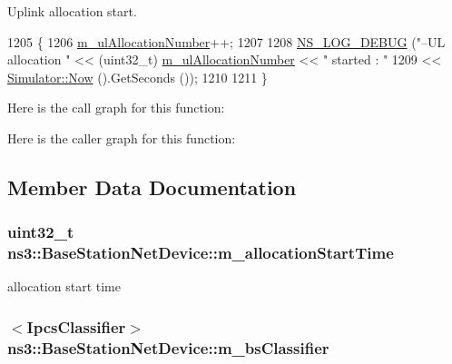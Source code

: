 Uplink allocation start. 


\begin{DoxyCode}
1205 \{
1206   \hyperlink{classns3_1_1BaseStationNetDevice_a8970c1e5d74da526640fb81a4ca173e4}{m\_ulAllocationNumber}++;
1207 
1208   \hyperlink{group__logging_ga413f1886406d49f59a6a0a89b77b4d0a}{NS\_LOG\_DEBUG} (\textcolor{stringliteral}{"--UL allocation "} << (uint32\_t) 
      \hyperlink{classns3_1_1BaseStationNetDevice_a8970c1e5d74da526640fb81a4ca173e4}{m\_ulAllocationNumber} << \textcolor{stringliteral}{" started : "}
1209                                    << \hyperlink{classns3_1_1Simulator_ac3178fa975b419f7875e7105be122800}{Simulator::Now} ().GetSeconds ());
1210 
1211 \}
\end{DoxyCode}


Here is the call graph for this function\+:




Here is the caller graph for this function\+:




\subsection{Member Data Documentation}
\subsubsection[{\texorpdfstring{m\+\_\+allocation\+Start\+Time}{m_allocationStartTime}}]{\setlength{\rightskip}{0pt plus 5cm}uint32\+\_\+t ns3\+::\+Base\+Station\+Net\+Device\+::m\+\_\+allocation\+Start\+Time\hspace{0.3cm}{\ttfamily [private]}}\hypertarget{classns3_1_1BaseStationNetDevice_a43eceef47108da17d13dde57aebea1fb}{}\label{classns3_1_1BaseStationNetDevice_a43eceef47108da17d13dde57aebea1fb}


allocation start time 

\subsubsection[{\texorpdfstring{m\+\_\+bs\+Classifier}{m_bsClassifier}}]{$<${\bf Ipcs\+Classifier}$>$ ns3\+::\+Base\+Station\+Net\+Device\+::m\+\_\+bs\+Classifier\hspace{0.3cm}{\ttfamily [private]}}\hypertarget{classns3_1_1BaseStationNetDevice_a6c1345e084e8b24efb463d90e2f0f85b}{}\label{classns3_1_1BaseStationNetDevice_a6c1345e084e8b24efb463d90e2f0f85b}


